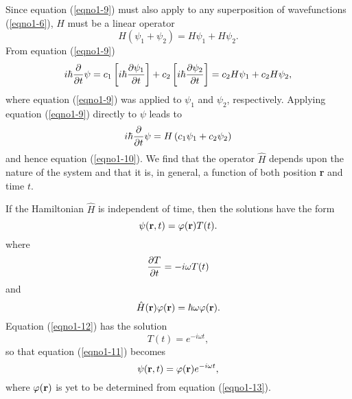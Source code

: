 Since equation (\ref{eqno1-9}) must also apply to any superposition of
wavefunctions (\ref{eqno1-6}), $H$ must be a linear operator
\begin{equation}
H (  \psi_1 + \psi_2 ) = H \psi_1 + H \psi_2 .
\label{eqno1-10}
\end{equation}
From equation (\ref{eqno1-9})
\begin{equation}
i \hbar {\partial \over \partial t} \psi = c_1 \left[ i \hbar {\partial 
\psi_1 \over \partial t} \right] + c_2 \left[ i \hbar {\partial \psi_2 
\over \partial t} \right] = c_2 H \psi_1 + c_2 H \psi_2,
\end{equation}
where equation (\ref{eqno1-9}) was applied to $\psi_1$ and $\psi_2$,
respectively.  Applying equation (\ref{eqno1-9}) directly to $\psi$
leads to
\begin{equation}
i \hbar {\partial \over \partial t} \psi = H \left( c_1 \psi_1 + c_2 \psi_2 
\right)
\end{equation}
and hence equation (\ref{eqno1-10}).  We find that the operator ${\hat
H}$ depends upon the nature of the system and that it is, in general,
a function of both position {\bf r} and time $t$.

If the Hamiltonian $\hat H$ is independent of time, then the solutions 
have the form
\begin{equation}
\psi ( {\bf r} , t ) = \varphi ( {\bf r} ) T ( t ).
\label{eqno1-11}
\end{equation}
where
\begin{equation}
{\partial T \over \partial t} = - i \omega T ( t )
\label{eqno1-12}
\end{equation}
and
\begin{equation}
{\hat H} ( {\bf r} ) \varphi ( {\bf r} ) = \hbar \omega \varphi ( {\bf 
r} ).
\label{eqno1-13}
\end{equation}
Equation (\ref{eqno1-12}) has the solution
\begin{equation}
T ( t ) = e^{- i \omega t} ,
\label{eqno1-14}
\end{equation}
so that equation (\ref{eqno1-11}) becomes
\begin{equation}
\psi ( {\bf r} , t ) = \varphi ( {\bf r} ) e^{- i \omega t},
\end{equation}
where $\varphi ( {\bf r} )$ is yet to be determined from equation
(\ref{eqno1-13}).

